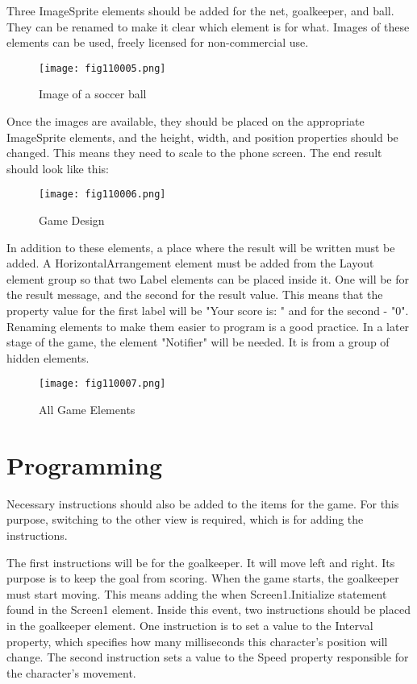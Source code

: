 Three ImageSprite elements should be added for the net, goalkeeper, and ball. They can be renamed to make it clear which element is for what. Images of these elements can be used, freely licensed for non-commercial use.

\begin{figure}[H]
   \centering
   \texttt{[image: fig110005.png]}
   \caption{Image of a soccer ball}
\label{fig110005}
\end{figure}

Once the images are available, they should be placed on the appropriate ImageSprite elements, and the height, width, and position properties should be changed. This means they need to scale to the phone screen. The end result should look like this:

\begin{figure}[H]
   \centering
   \texttt{[image: fig110006.png]}
   \caption{Game Design}
\label{fig110006}
\end{figure}

In addition to these elements, a place where the result will be written must be added. A HorizontalArrangement element must be added from the Layout element group so that two Label elements can be placed inside it. One will be for the result message, and the second for the result value. This means that the property value for the first label will be "Your score is: " and for the second - "0". Renaming elements to make them easier to program is a good practice. In a later stage of the game, the element "Notifier" will be needed. It is from a group of hidden elements.

\begin{figure}[H]
   \centering
   \texttt{[image: fig110007.png]}
   \caption{All Game Elements}
\label{fig110007}
\end{figure}

\section{Programming}
Necessary instructions should also be added to the items for the game. For this purpose, switching to the other view is required, which is for adding the instructions.

The first instructions will be for the goalkeeper. It will move left and right. Its purpose is to keep the goal from scoring. When the game starts, the goalkeeper must start moving. This means adding the when Screen1.Initialize statement found in the Screen1 element. Inside this event, two instructions should be placed in the goalkeeper element. One instruction is to set a value to the Interval property, which specifies how many milliseconds this character's position will change. The second instruction sets a value to the Speed property responsible for the character's movement.

